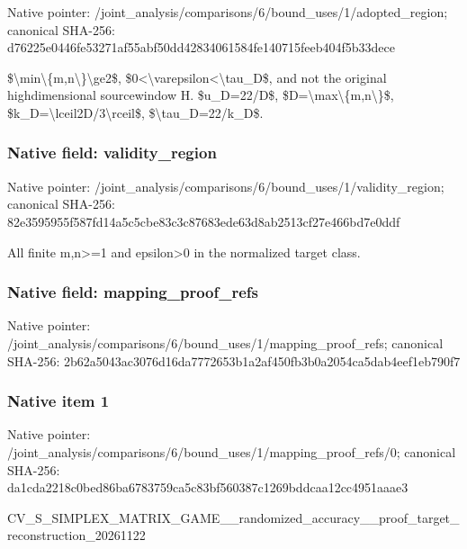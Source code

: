 \documentclass[10pt,a4paper]{article}
\begin{document}
Native pointer: /joint\_analysis/comparis\allowbreak{}ons/6/bound\_uses/1/adopt\allowbreak{}ed\_region; canonical SHA-256: d76225e0446fe53271af55ab\allowbreak{}f50dd42834061584fe140715\allowbreak{}feeb404f5b33dece


\$\textbackslash{}min\textbackslash{}\{m,n\textbackslash{}\}\textbackslash{}ge2\$, \$0<\textbackslash{}varepsilon<\textbackslash{}tau\_D\$, and not the original highdimensional sourcewindow H. \$u\_D=22/D\$, \$D=\textbackslash{}max\textbackslash{}\{m,n\textbackslash{}\}\$, \$k\_D=\textbackslash{}lceil2D/3\textbackslash{}rceil\$, \$\textbackslash{}tau\_D=22/k\_D\$.


\subsubsection{Native field: validity\_region}


Native pointer: /joint\_analysis/comparis\allowbreak{}ons/6/bound\_uses/1/valid\allowbreak{}ity\_region; canonical SHA-256: 82e3595955f587fd14a5c5cb\allowbreak{}e83c3c87683ede63d8ab2513\allowbreak{}cf27e466bd7e0ddf


All finite m,n>=1 and epsilon>0 in the normalized target class.


\subsubsection{Native field: mapping\_proof\_refs}


Native pointer: /joint\_analysis/comparis\allowbreak{}ons/6/bound\_uses/1/mappi\allowbreak{}ng\_proof\_refs; canonical SHA-256: 2b62a5043ac3076d16da7772\allowbreak{}653b1a2af450fb3b0a2054ca\allowbreak{}5dab4eef1eb790f7



\subsubsection{Native item 1}


Native pointer: /joint\_analysis/comparis\allowbreak{}ons/6/bound\_uses/1/mappi\allowbreak{}ng\_proof\_refs/0; canonical SHA-256: da1cda2218c0bed86ba67837\allowbreak{}59ca5c83bf560387c1269bdd\allowbreak{}caa12cc4951aaae3


CV\_S\_SIMPLEX\_MATRIX\_GAME\allowbreak{}\_\_randomized\_accuracy\_\_p\allowbreak{}roof\_target\_reconstructi\allowbreak{}on\_20261122
\end{document}
